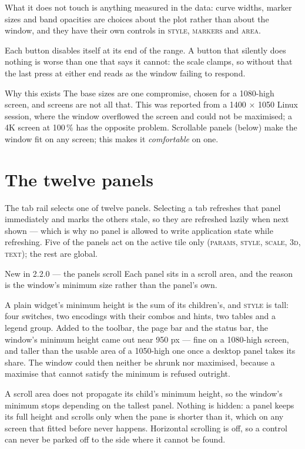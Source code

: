 \documentclass[11pt,a4paper,oneside]{report}
\newcommand{\appver}{2.2.0}
\newcommand{\tab}[1]{\textsc{#1}}
\begin{document}
What it does not touch is anything measured in the data: curve widths, marker
sizes and band opacities are choices about the plot rather than about the
window, and they have their own controls in \tab{style}, \tab{markers} and
\tab{area}.

Each button disables itself at its end of the range. A button that silently
does nothing is worse than one that says it cannot: the scale clamps, so
without that the last press at either end reads as the window failing to
respond.

\begin{aoenote}{Why this exists}
The base sizes are one compromise, chosen for a 1080-high screen, and screens
are not all that. This was reported from a 1400 $\times$ 1050 Linux session,
where the window overflowed the screen and could not be maximised; a 4K screen
at 100\,\% has the opposite problem. Scrollable panels (below) make the window
fit on any screen; this makes it \emph{comfortable} on one.
\end{aoenote}

\chapter{The twelve panels}

The tab rail selects one of twelve panels. Selecting a tab refreshes that panel
immediately and marks the others stale, so they are refreshed lazily when next
shown --- which is why no panel is allowed to write application state while
refreshing. Five of the panels act on the active tile only (\tab{params},
\tab{style}, \tab{scale}, \tab{3d}, \tab{text}); the rest are global.

\begin{aoenew}{New in \appver{} --- the panels scroll}
Each panel sits in a scroll area, and the reason is the window's minimum size
rather than the panel's own.

A plain widget's minimum height is the sum of its children's, and \tab{style}
is tall: four switches, two encodings with their combos and hints, two tables
and a legend group. Added to the toolbar, the page bar and the status bar, the
window's minimum height came out near 950 px --- fine on a 1080-high screen,
and taller than the usable area of a 1050-high one once a desktop panel takes
its share. The window could then neither be shrunk nor maximised, because a
maximise that cannot satisfy the minimum is refused outright.

A scroll area does not propagate its child's minimum height, so the window's
minimum stops depending on the tallest panel. Nothing is hidden: a panel keeps
its full height and scrolls only when the pane is shorter than it, which on any
screen that fitted before never happens. Horizontal scrolling is off, so a
control can never be parked off to the side where it cannot be found.
\end{aoenew}
\end{document}
